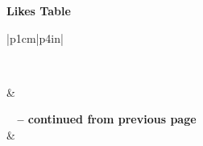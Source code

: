 \textbf{Likes Table}
\begin{longtable}{|p{1cm}|p{4in}|}
\caption{Likes Table.} \vspace{0.25em} \\ \hline 

\hline {} &  \\ \hline 
\endfirsthead

{{\bfseries \tablename\ \thetable{} -- continued from previous page}} \\
\hline {} &  \\ \hline 
\endhead

\hline {} \\ \hline
\endfoot

\hline \hline
\endlastfoot


\end{longtable}

